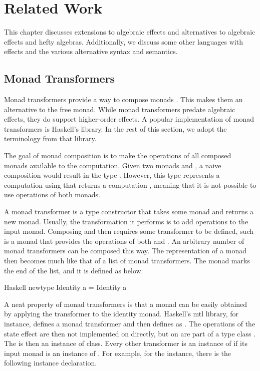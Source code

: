 \chapter{Related Work}\label{chap:related_work}

This chapter discusses extensions to algebraic effects and alternatives to algebraic effects and hefty algebras. Additionally, we discuss some other languages with effects and the various alternative syntax and semantics.

\section{Monad Transformers}\label{sec:monad_transformers}

Monad transformers provide a way to compose monads \autocite{moggi_abstract_1989}. This makes them an alternative to the free monad. While monad transformers predate algebraic effects, they do support higher-order effects. A popular implementation of monad transformers is Haskell's  library. In the rest of this section, we adopt the terminology from that library.

The goal of monad composition is to make the operations of all composed monads available to the computation. Given two monads  and , a naive composition would result in the type . However, this type represents a computation using  that returns a computation , meaning that it is not possible to use operations of both monads.

A monad transformer is a type constructor that takes some monad and returns a new monad. Usually, the transformation it performs is to add operations to the input monad. Composing  and  then requires some transformer  to be defined, such  is a monad that provides the operations of both  and . An arbitrary number of monad transformers can be composed this way. The representation of a monad then becomes much like that of a list of monad transformers. The  monad marks the end of the list, and it is defined as below.

\begin{lst}{Haskell}
newtype Identity a = Identity a
\end{lst}
%
A neat property of monad transformers is that a monad can be easily obtained by applying the transformer to the identity monad. Haskell's mtl library, for instance, defines a monad transformer  and then defines  as . The operations of the state effect are then not implemented on  directly, but on are part of a type class . The  is then an instance of  class. Every other transformer is an instance of  if its input monad is an instance of . For example, for the  instance, there is the following instance declaration.

